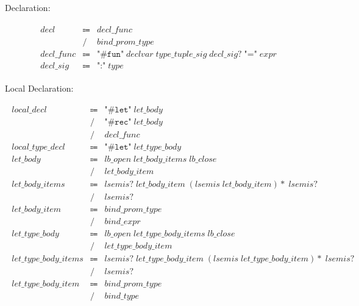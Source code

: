 Declaration:

\begin{align*}
    \begin{array}{rcll}
        \mathit{decl}
        &\Coloneq &\mathit{decl\_func} \\
        &\mathrel{/} &\mathit{bind\_prom\_type} \\
        \mathit{decl\_func}
        &\Coloneq &\texttt{"\#fun"}\; \mathit{declvar}\; \mathit{type\_tuple\_sig}\; \mathit{decl\_sig}{?}\; \texttt{"="}\; \mathit{expr} \\
        \mathit{decl\_sig}
        &\Coloneq &\texttt{":"}\; \mathit{type}
    \end{array}
\end{align*}

Local Declaration:

\begin{align*}
    \begin{array}{rcll}
        \mathit{local\_decl}
        &\Coloneq &\texttt{"\#let"}\; \mathit{let\_body} \\
        &\mathrel{/} &\texttt{"\#rec"}\; \mathit{let\_body} \\
        &\mathrel{/} &\mathit{decl\_func} \\
        \mathit{local\_type\_decl}
        &\Coloneq &\texttt{"\#let"}\; \mathit{let\_type\_body} \\
        \mathit{let\_body}
        &\Coloneq &\mathit{lb\_open}\; \mathit{let\_body\_items}\; \mathit{lb\_close} \\
        &\mathrel{/} &\mathit{let\_body\_item} \\
        \mathit{let\_body\_items}
        &\Coloneq &\mathit{lsemis}{?}\; \mathit{let\_body\_item}\; (\mathit{lsemis}\; \mathit{let\_body\_item}){*}\; \mathit{lsemis}{?} \\
        &\mathrel{/} &\mathit{lsemis}{?} \\
        \mathit{let\_body\_item}
        &\Coloneq &\mathit{bind\_prom\_type} \\
        &\mathrel{/} &\mathit{bind\_expr} \\
        \mathit{let\_type\_body}
        &\Coloneq &\mathit{lb\_open}\; \mathit{let\_type\_body\_items}\; \mathit{lb\_close} \\
        &\mathrel{/} &\mathit{let\_type\_body\_item} \\
        \mathit{let\_type\_body\_items}
        &\Coloneq &\mathit{lsemis}{?}\; \mathit{let\_type\_body\_item}\; (\mathit{lsemis}\; \mathit{let\_type\_body\_item}){*}\; \mathit{lsemis}{?} \\
        &\mathrel{/} &\mathit{lsemis}{?} \\
        \mathit{let\_type\_body\_item}
        &\Coloneq & \mathit{bind\_prom\_type} \\
        &\mathrel{/} &\mathit{bind\_type}
    \end{array}
\end{align*}

